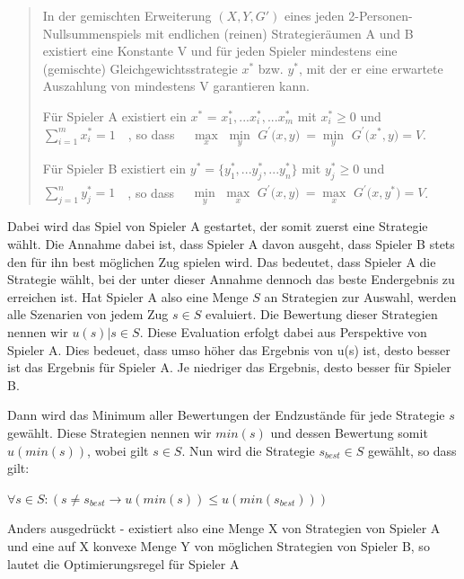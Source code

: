 \begin{quote}
In der gemischten Erweiterung $(X, Y, G')$ eines jeden 2-Personen-Nullsummenspiels mit endlichen (reinen) Strategieräumen A und B existiert eine Konstante V und für jeden Spieler mindestens eine (gemischte) Gleichgewichtsstrategie $x^*$ bzw. $y^*$, mit der er eine erwartete Auszahlung von mindestens V garantieren kann.

Für Spieler A existiert ein $x^*$ = ${x^*_1, ... x^*_i, ... x^*_m}$ mit $x^*_i \geq 0$ und $\sum_{i = 1}^m x^*_i= 1\quad $, so dass $\quad \max\limits_x$ $\min\limits_y$ $G^\prime\bigl(x,y\bigr)\ = \min\limits_y$ $G^\prime\bigl(x^*,y\bigr) = V$.

Für Spieler B existiert ein $y^* = \{ y^*_1, ... y^*_j, ... y^*_n\}$ mit $y^*_j\ge 0 $ und $\sum_{j = 1}^n y^*_j= 1\quad$, 
so dass $\quad \min\limits_y$ $\max\limits_x$ $G^\prime\bigl(x,y\bigr)\ = \max\limits_x$ $G^\prime\bigl(x,y^*\bigr) = V$.
\textsuperscript{\cite{}}
\end{quote}

Dabei wird das Spiel von Spieler A gestartet, der somit zuerst eine Strategie wählt. Die Annahme dabei ist, dass Spieler A davon ausgeht, dass Spieler B stets den für ihn best möglichen Zug spielen wird. Das bedeutet, dass Spieler A die Strategie wählt, bei der unter dieser Annahme dennoch das beste Endergebnis zu erreichen ist. Hat Spieler A also eine Menge $S$ an Strategien zur Auswahl, werden alle Szenarien von jedem Zug $s \in S$ evaluiert. Die Bewertung dieser Strategien nennen wir $u(s) | s \in S$. Diese Evaluation erfolgt dabei aus Perspektive von Spieler A. Dies bedeuet, dass umso höher das Ergebnis von u(s) ist, desto besser ist das Ergebnis für Spieler A. Je niedriger das Ergebnis, desto besser für Spieler B.

Dann wird das Minimum aller Bewertungen der Endzustände für jede Strategie $s$ gewählt. Diese Strategien nennen wir $min(s)$ und dessen Bewertung somit $u(min(s))$, wobei gilt $s \in S$. Nun wird die Strategie $s_{best} \in S$ gewählt, so dass gilt:

$ \forall s \in S : (s \neq s_{best} \rightarrow u(min(s)) \leq u(min(s_{best})))$

Anders ausgedrückt - existiert also eine Menge X von Strategien von Spieler A und eine auf X konvexe Menge Y von möglichen Strategien von Spieler B, so lautet die Optimierungsregel für Spieler A

